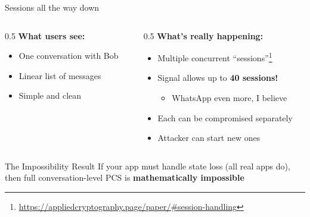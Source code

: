 \ifdefined\PRESENTATION\else\PassOptionsToClass{handout}{beamer}\fi\documentclass[aspectratio=169, lualatex]{beamer}
\begin{document}
\begin{frame}{Sessions all the way down}
	\begin{columns}[c]
		\begin{column}{0.5\textwidth}
			\textbf{What users see:}
			\begin{itemize}
				\item One conversation with Bob
				\item Linear list of messages
				\item Simple and clean
			\end{itemize}
		\end{column}
		\begin{column}{0.5\textwidth}
			\textbf{What's really happening:}
			\begin{itemize}
				\item Multiple concurrent ``sessions''\footnote{\url{https://appliedcryptography.page/paper/\#session-handling}}
				\item Signal allows up to \textbf{40 sessions!}
				      \begin{itemize}
					      \item WhatsApp even more, I believe
				      \end{itemize}
				\item Each can be compromised separately
				\item Attacker can start new ones
			\end{itemize}
		\end{column}
	\end{columns}
	\begin{block}{The Impossibility Result}
		If your app must handle state loss (all real apps do), then full conversation-level PCS is \textbf{mathematically impossible}
	\end{block}
\end{frame}
\end{document}
